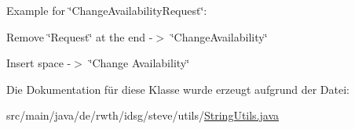Example for \char`\"{}\+Change\+Availability\+Request\char`\"{}\+:
\begin{DoxyItemize}
\item Remove \char`\"{}\+Request\char`\"{} at the end -\/$>$ \char`\"{}\+Change\+Availability\char`\"{}
\item Insert space -\/$>$ \char`\"{}\+Change Availability\char`\"{} 
\end{DoxyItemize}

Die Dokumentation für diese Klasse wurde erzeugt aufgrund der Datei\+:\begin{DoxyCompactItemize}
\item 
src/main/java/de/rwth/idsg/steve/utils/\hyperlink{_string_utils_8java}{String\+Utils.\+java}\end{DoxyCompactItemize}
